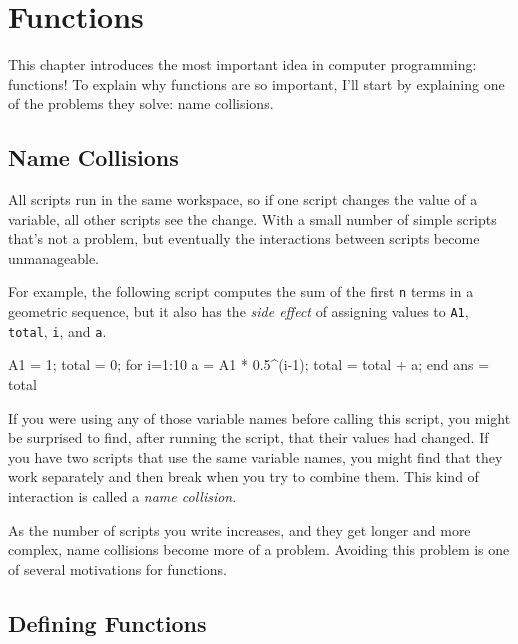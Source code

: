 \chapter{Functions}
\label{functions}

This chapter introduces the most important idea in computer programming: functions! 
To explain why functions are so important, I'll start by explaining one of the problems they solve: name collisions.


\section{Name Collisions}
\label{collision}


All scripts run in the same workspace, so if one script changes the value of a variable, all other scripts see the change.  With a small number of simple scripts that's not a problem, but eventually the interactions between scripts become unmanageable.

For example, the following script computes the
sum of the first \lstinline{n} terms in a geometric sequence, but it also
has the {\em side effect} of assigning values to \lstinline{A1}, \lstinline{total},
\lstinline{i}, and \lstinline{a}.

\begin{code}
A1 = 1;
total = 0;
for i=1:10
    a = A1 * 0.5^(i-1);
    total = total + a;
end
ans = total
\end{code}

If you were using any of those variable names before calling this
script, you might be surprised to find, after running the script,
that their values had changed.  If you have two scripts that use
the same variable names, you might find that they work separately
and then break when you try to combine them.  This kind of
interaction is called a \emph{name collision}.


As the number of scripts you write increases, and they get longer
and more complex, name collisions become more of a problem.  Avoiding
this problem is one of several motivations for functions.

\section{Defining Functions}

